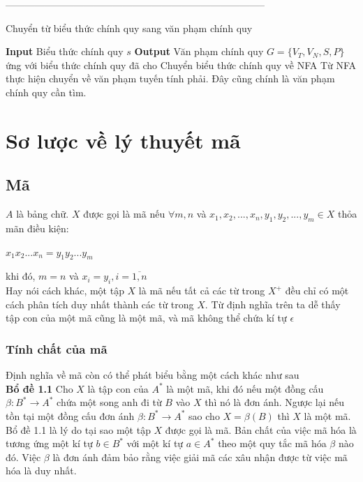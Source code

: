 \documentclass[14pt]{extreport}
\begin{document}
--------------------------------------------------------------------------------\\
\begin{algorithm}[H]
\caption{Chuyển từ biểu thức chính quy sang văn phạm chính quy}
\begin{algorithmic} 
\STATE \textbf{Input} Biểu thức chính quy $s$
\STATE \textbf{Output} Văn phạm chính quy $G = \{V_T, V_N, S, P\}$ ứng với biểu thức chính quy đã cho
\STATE Chuyển biểu thức chính quy về NFA
\STATE Từ NFA thực hiện chuyển về văn phạm tuyến tính phải. Đây cũng chính là văn phạm chính quy cần tìm.
\end{algorithmic}
\end{algorithm}

\chapter{Sơ lược về lý thuyết mã}
\section{Mã}
$A$ là bảng chữ. $X$ được gọi là mã nếu $\forall m,n$ và $x_1,x_2,...,x_n,y_1,y_2,...,y_m \in X$ thỏa mãn điều kiện:
\begin{center}
$x_1x_2...x_n=y_1y_2...y_m$
\end{center}
khi đó, $m=n$ và $x_i=y_i,i=\overline{1,n}$ \\
Hay nói cách khác, một tập $X$ là mã nếu tất cả các từ trong $X^+$ đều chỉ có một cách phân tích duy nhất thành các từ trong $X$.
Từ định nghĩa trên ta dễ thấy tập con của một mã cũng là một mã, và mã không thể chứa kí tự $\epsilon$
\subsection{Tính chất của mã}
Định nghĩa về mã còn có thể phát biểu bằng một cách khác như sau\\
\textbf{Bổ đề 1.1} Cho $X$ là tập con của $A^*$ là một mã, khi đó nếu một đồng cấu $\beta : B^* \rightarrow A^*$ chứa một song anh đi từ $B$ vào $X$ thì nó là đơn ánh. Ngược lại nếu tồn tại một đồng cấu đơn ánh $\beta : B^* \rightarrow A^*$ sao cho $X = \beta(B)$ thì $X$ là một mã. \\
Bổ đề 1.1 là lý do tại sao một tập $X$ được gọi là mã. Bản chất của việc mã hóa là tương ứng một kí tự $b \in B^*$ với một kí tự $a \in A^*$ theo một quy tắc mã hóa $\beta$ nào đó. Việc $\beta$ là đơn ánh đảm bảo rằng việc giải mã các xâu nhận được từ việc mã hóa là duy nhất.\\
\end{document}

